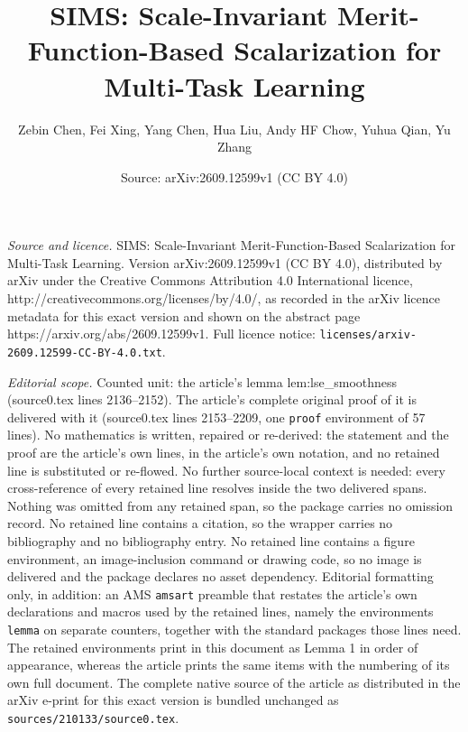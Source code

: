 \documentclass[10pt,a4paper]{amsart}
\title{SIMS: Scale-Invariant Merit-Function-Based Scalarization for Multi-Task Learning}
\author{Zebin Chen, Fei Xing, Yang Chen, Hua Liu, Andy HF Chow, Yuhua Qian, Yu Zhang}
\date{Source: arXiv:2609.12599v1 (CC BY 4.0)}
\begin{document}
\maketitle

\noindent\emph{Source and licence.} SIMS: Scale-Invariant Merit-Function-Based Scalarization for Multi-Task Learning. Version arXiv:2609.12599v1 (CC BY 4.0), distributed by arXiv under the Creative Commons Attribution 4.0 International licence, http://creativecommons.org/licenses/by/4.0/, as recorded in the arXiv licence metadata for this exact version and shown on the abstract page https://arxiv.org/abs/2609.12599v1. Full licence notice: \texttt{licenses/arxiv-2609.12599-CC-BY-4.0.txt}.\par\smallskip

\noindent\textit{Editorial scope.} Counted unit: the article's lemma lem:lse\_smoothness (source0.tex lines 2136--2152). The article's complete original proof of it is delivered with it (source0.tex lines 2153--2209, one \texttt{proof} environment of 57 lines). No mathematics is written, repaired or re-derived: the statement and the proof are the article's own lines, in the article's own notation, and no retained line is substituted or re-flowed.  No further source-local context is needed: every cross-reference of every retained line resolves inside the two delivered spans.  Nothing was omitted from any retained span, so the package carries no omission record.  No retained line contains a citation, so the wrapper carries no bibliography and no bibliography entry.  No retained line contains a figure environment, an image-inclusion command or drawing code, so no image is delivered and the package declares no asset dependency.  Editorial formatting only, in addition: an AMS \texttt{amsart} preamble that restates the article's own declarations and macros used by the retained lines, namely the environments \texttt{lemma} on separate counters, together with the standard packages those lines need.  The retained environments print in this document as Lemma 1 in order of appearance, whereas the article prints the same items with the numbering of its own full document.  The complete native source of the article as distributed in the arXiv e-print for this exact version is bundled unchanged as \texttt{sources/210133/source0.tex}.
\end{document}
